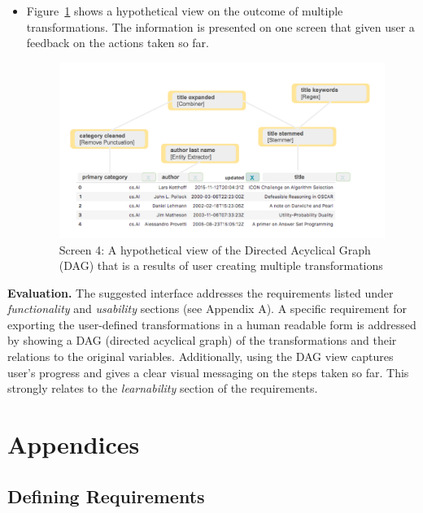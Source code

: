 \documentclass[12pt,letterpaper]{article}
\begin{document}
\begin{itemize}
    \item Figure~\ref{fig::5} shows a hypothetical view on the outcome of multiple transformations. The information is presented on one screen that given user a feedback on the actions taken so far.

\begin{figure}[h]
\centering
\includegraphics[scale=.3]{figures/m3/wireframe-screen5.png}
\caption{Screen 4: A hypothetical view of the Directed Acyclical Graph (DAG) that is a results of user creating multiple transformations}
\label{fig::5}
\end{figure}

\end{itemize}

\textbf{Evaluation.} The suggested interface addresses the requirements listed under \textit{functionality} and \textit{usability} sections (see Appendix A). A specific requirement for exporting the user-defined transformations in a human readable form is addressed by showing a DAG (directed acyclical graph) of the transformations and their relations to the original variables.  Additionally, using the DAG view captures user's progress and gives a clear visual messaging on the steps taken so far. This strongly relates to the \textit{learnability} section of the requirements.  


 


\newpage
\section*{Appendices}

\appendix

\subsection*{Defining Requirements}
\end{document}
